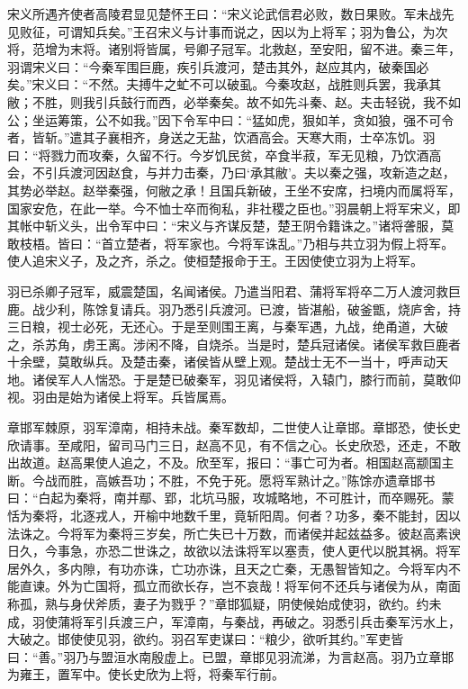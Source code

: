 \documentclass[12pt,UTF8]{ctexbook}
\begin{document}
宋义所遇齐使者高陵君显见楚怀王曰：“宋义论武信君必败，数日果败。军未战先见败征，可谓知兵矣。”王召宋义与计事而说之，因以为上将军；羽为鲁公，为次将，范增为末将。诸别将皆属，号卿子冠军。北救赵，至安阳，留不进。秦三年，羽谓宋义曰：“今秦军围巨鹿，疾引兵渡河，楚击其外，赵应其内，破秦国必矣。”宋义曰：“不然。夫搏牛之虻不可以破虱。今秦攻赵，战胜则兵罢，我承其敝；不胜，则我引兵鼓行而西，必举秦矣。故不如先斗秦、赵。夫击轻锐，我不如公；坐运筹策，公不如我。”因下令军中曰：“猛如虎，狠如羊，贪如狼，强不可令者，皆斩。”遣其子襄相齐，身送之无盐，饮酒高会。天寒大雨，士卒冻饥。羽曰：“将戮力而攻秦，久留不行。今岁饥民贫，卒食半菽，军无见粮，乃饮酒高会，不引兵渡河因赵食，与并力击秦，乃曰‘承其敝’。夫以秦之强，攻新造之赵，其势必举赵。赵举秦强，何敝之承！且国兵新破，王坐不安席，扫境内而属将军，国家安危，在此一举。今不恤士卒而徇私，非社稷之臣也。”羽晨朝上将军宋义，即其帐中斩义头，出令军中曰：“宋义与齐谋反楚，楚王阴令籍诛之。”诸将詟服，莫敢枝梧。皆曰：“首立楚者，将军家也。今将军诛乱。”乃相与共立羽为假上将军。使人追宋义子，及之齐，杀之。使桓楚报命于王。王因使使立羽为上将军。



羽已杀卿子冠军，威震楚国，名闻诸侯。乃遣当阳君、蒲将军将卒二万人渡河救巨鹿。战少利，陈馀复请兵。羽乃悉引兵渡河。已渡，皆湛船，破釜甑，烧庐舍，持三日粮，视士必死，无还心。于是至则围王离，与秦军遇，九战，绝甬道，大破之，杀苏角，虏王离。涉闲不降，自烧杀。当是时，楚兵冠诸侯。诸侯军救巨鹿者十余壁，莫敢纵兵。及楚击秦，诸侯皆从壁上观。楚战士无不一当十，呼声动天地。诸侯军人人惴恐。于是楚已破秦军，羽见诸侯将，入辕门，膝行而前，莫敢仰视。羽由是始为诸侯上将军。兵皆属焉。



章邯军棘原，羽军漳南，相持未战。秦军数却，二世使人让章邯。章邯恐，使长史欣请事。至咸阳，留司马门三日，赵高不见，有不信之心。长史欣恐，还走，不敢出故道。赵高果使人追之，不及。欣至军，报曰：“事亡可为者。相国赵高颛国主断。今战而胜，高嫉吾功；不胜，不免于死。愿将军熟计之。”陈馀亦遗章邯书曰：“白起为秦将，南并鄢、郢，北坑马服，攻城略地，不可胜计，而卒赐死。蒙恬为秦将，北逐戎人，开榆中地数千里，竟斩阳周。何者？功多，秦不能封，因以法诛之。今将军为秦将三岁矣，所亡失已十万数，而诸侯并起兹益多。彼赵高素谀日久，今事急，亦恐二世诛之，故欲以法诛将军以塞责，使人更代以脱其祸。将军居外久，多内隙，有功亦诛，亡功亦诛，且天之亡秦，无愚智皆知之。今将军内不能直谏。外为亡国将，孤立而欲长存，岂不哀哉！将军何不还兵与诸侯为从，南面称孤，熟与身伏斧质，妻子为戮乎？”章邯狐疑，阴使候始成使羽，欲约。约未成，羽使蒲将军引兵渡三户，军漳南，与秦战，再破之。羽悉引兵击秦军污水上，大破之。邯使使见羽，欲约。羽召军吏谋曰：“粮少，欲听其约。”军吏皆曰：“善。”羽乃与盟洹水南殷虚上。已盟，章邯见羽流涕，为言赵高。羽乃立章邯为雍王，置军中。使长史欣为上将，将秦军行前。
\end{document}

